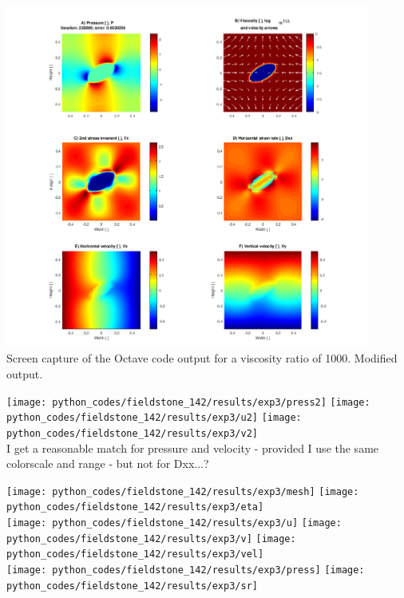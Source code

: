 \begin{center}
\includegraphics[width=12cm]{python_codes/fieldstone_142/images/octave2}\\
{\captionfont Screen capture of the Octave code output for a viscosity ratio of 1000.
Modified output.}
\end{center}

\begin{center}
\texttt{[image: python\_codes/fieldstone\_142/results/exp3/press2]}
\texttt{[image: python\_codes/fieldstone\_142/results/exp3/u2]}
\texttt{[image: python\_codes/fieldstone\_142/results/exp3/v2]}\\
{\captionfont I get a reasonable match for pressure and velocity - provided I use 
the same colorscale and range - but not for Dxx...?}
\end{center}



\begin{center}
\texttt{[image: python\_codes/fieldstone\_142/results/exp3/mesh]}
\texttt{[image: python\_codes/fieldstone\_142/results/exp3/eta]}\\
\texttt{[image: python\_codes/fieldstone\_142/results/exp3/u]}
\texttt{[image: python\_codes/fieldstone\_142/results/exp3/v]}
\texttt{[image: python\_codes/fieldstone\_142/results/exp3/vel]}\\
\texttt{[image: python\_codes/fieldstone\_142/results/exp3/press]}
\texttt{[image: python\_codes/fieldstone\_142/results/exp3/sr]}
\end{center}


